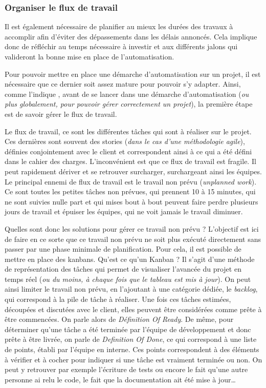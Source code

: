\subsubsection{Organiser le flux de travail}
Il est également nécessaire de planifier au mieux les durées des travaux à accomplir afin d'éviter des dépassements dans les délais annoncés. Cela implique donc de réfléchir au temps nécessaire à investir et aux différents jalons qui valideront la bonne mise en place de l'automatisation. 

Pour pouvoir mettre en place une démarche d'automatisation sur un projet, il est nécessaire que ce dernier soit assez mature pour pouvoir s'y adapter. Ainsi, comme l'indique  \cite{phoenixProject},  avant de se lancer dans une démarche d'automatisation (\emph{ou plus globalement, pour pouvoir gérer correctement un projet}), la première étape est de savoir gérer le flux de travail.

Le flux de travail, ce sont les différentes tâches qui sont à réaliser sur le projet. Ces dernières sont souvent des stories (\emph{dans le cas d'une méthodologie agile}), définies conjointement avec le client et correspondent ainsi à ce qui a été défini dans le cahier des charges. L'inconvénient est que ce flux de travail est fragile. Il peut rapidement dériver et se retrouver surcharger, surchargeant ainsi les équipes. Le principal ennemi de flux de travail est le travail non prévu (\emph{unplanned work}). Ce sont toutes les petites tâches non prévues, qui prennent 10 à 15 minutes, qui ne sont suivies nulle part et qui mises bout à bout peuvent faire perdre plusieurs jours de travail et épuiser les équipes, qui ne voit jamais le travail diminuer.

Quelles sont donc les solutions pour gérer ce travail non prévu ? L'objectif est ici de faire en ce sorte que ce travail non prévu ne soit plus exécuté directement sans passer par une phase minimale de planification. Pour cela, il est possible de mettre en place des kanbans. Qu'est ce qu'un Kanban ? Il s'agit d'une méthode de représentation des tâches qui permet de visualiser l'avancée du projet en temps réel (\emph{ou du moins, à chaque fois que le tableau est mis à jour}). On peut ainsi limiter le travail non prévu, en l'ajoutant à une catégorie dédiée, le \emph{backlog}, qui correspond à la pile de tâche à réaliser. Une fois ces tâches estimées, découpées et discutées avec le client, elles peuvent être considérées comme prête à être commencées. On parle alors de \emph{Définition Of Ready}. De même, pour déterminer qu'une tâche a été terminée par l'équipe de développement et donc prête à être livrée, on parle de \emph{Definition Of Done}, ce qui correspond à une liste de points, établi par l'équipe en interne. Ces points correspondent à des éléments à vérifier et à cocher pour indiquer si une tâche est vraiment terminée ou non. On peut y retrouver par exemple l'écriture de tests ou encore le fait qu'une autre personne ai relu le code, le fait que la documentation ait été mise à jour\ldots

